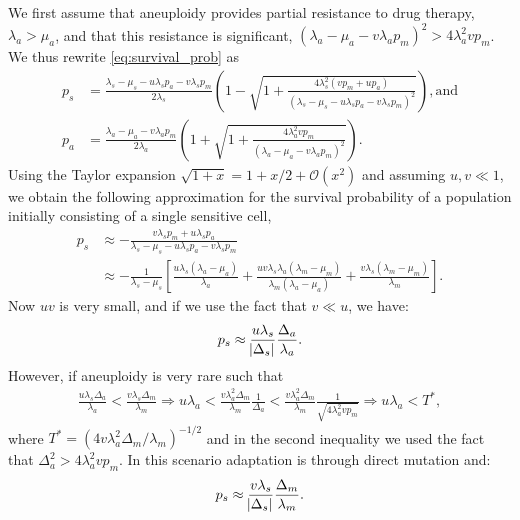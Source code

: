\documentclass[12pt]{extarticle}
\begin{document}
\begin{appendices}
We first assume that aneuploidy provides partial resistance to drug therapy, $\lambda_a>\mu_a$, and that this resistance is significant, $\left(\lambda_a-\mu_a-v\lambda_ap_m\right)^2 > 4\lambda_a^2 v p_m$.
We thus rewrite \cref{eq:survival_prob} as
\begin{align*}
p_s&=\frac{\lambda_s-\mu_s-u\lambda_sp_a-v\lambda_sp_m}{2\lambda_s}\left(1-\sqrt{1+\frac{4\lambda_s^2\left(vp_m+up_a\right)}{\left(\lambda_s-\mu_s-u\lambda_sp_a-v\lambda_sp_m\right)^2}}\right) ,
\text{and} \\
p_a&=\frac{\lambda_a-\mu_a-v\lambda_ap_m}{2\lambda_a}\left(1+\sqrt{1+\frac{4\lambda_a^2vp_m}{\left(\lambda_a-\mu_a-v\lambda_ap_m\right)^2}}\right) . 
\end{align*}
Using the Taylor expansion $\sqrt{1+x}=1+x/2+\mathcal{O}(x^2)$ and assuming $u,v \ll 1$,
we obtain the following approximation for the survival probability of a population initially consisting of a single sensitive cell,
\begin{align} \label{eq:survprobwapprox1}
p_s
&\approx -\frac{v\lambda_sp_m+u\lambda_sp_a}{\lambda_s-\mu_s-u\lambda_sp_a-v\lambda_sp_m}\\
\nonumber
&\approx-\frac{1}{\lambda_s-\mu_s}\left[\frac{u\lambda_s\left(\lambda_a-\mu_a\right)}{\lambda_a}+\frac{uv\lambda_s\lambda_a\left(\lambda_m-\mu_m\right)}{\lambda_m\left(\lambda_a-\mu_a\right)}+\frac{v\lambda_s\left(\lambda_m-\mu_m\right)}{\lambda_m}\right].
\end{align}
Now $u v$ is very small, and if we use the fact that $v \ll u$, we have:
\begin{equation}\label{eq:pw_parttolerant}
p_s \approx \frac{u\lambda_s}{\abs{\Delta_s}}  \frac{\Delta_a}{\lambda_a} .
\end{equation}
However, if aneuploidy is very rare such that
\begin{align*}
\frac{u\lambda_s\Delta_a}{\lambda_a}<\frac{v\lambda_s\Delta_m}{\lambda_m}\Rightarrow u\lambda_a<\frac{v\lambda_a^2\Delta_m}{\lambda_m} \frac{1}{\Delta_a}<\frac{v\lambda_a^2\Delta_m}{\lambda_m} \frac{1}{\sqrt{4\lambda_a^2 v p_m}}\Rightarrow u\lambda_a<T^*,
\end{align*}
where $T^* = (4 v \lambda_a^2 \Delta_m/\lambda_m)^{-1/2}$ and in the second inequality we used the fact that $\Delta_a^2 > 4\lambda_a^2 v p_m$. In this scenario adaptation is through direct mutation and:
\begin{equation*}
p_s \approx \frac{v\lambda_s}{\abs{\Delta_s}}  \frac{\Delta_m}{\lambda_m} .
\end{equation*}

\end{appendices}
\end{document}
